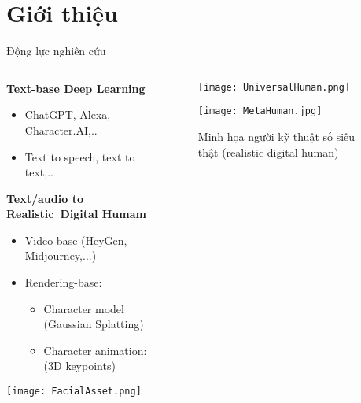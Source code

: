 \section{Giới thiệu}

\begin{frame}{Động lực nghiên cứu}
	\vspace{5pt}
	
	\begin{columns}
	\begin{column}{0.7\textwidth}
		\textbf{Text-base Deep Learning}
		\begin{itemize}
			\item ChatGPT, Alexa, Character.AI,..
			\item Text to speech, text to text,..
		\end{itemize}
		
		\textbf{Text/audio to Realistic Digital Humam}
		
		\begin{itemize}
			\item Video-base (HeyGen, Midjourney,...)
			\item Rendering-base:
			\begin{itemize}
				\item Character model (Gaussian Splatting)
				\item Character animation: (3D keypoints)
			\end{itemize}
		\end{itemize}
		\vspace{5pt}
		\centering
		\texttt{[image: FacialAsset.png]}
	\end{column}
	
	\begin{column}{0.3\textwidth}
		\begin{figure}
				\texttt{[image: UniversalHuman.png]}
		\end{figure}
		
		\begin{figure}
			\texttt{[image: MetaHuman.jpg]}
			\caption{\small Minh họa người kỹ thuật số siêu thật (realistic digital human)}
		\end{figure}
	
	\end{column}
	
	\end{columns}
\end{frame}



